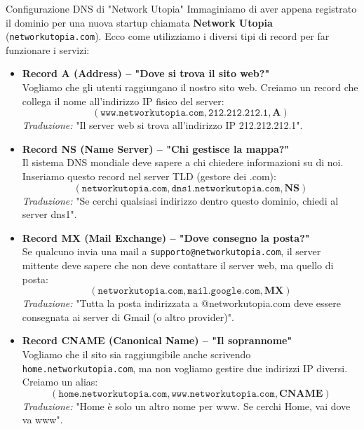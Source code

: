 \documentclass[a4paper,12pt]{report}
\begin{document}
\begin{esempiobox}{ Configurazione DNS di "Network Utopia"}
    Immaginiamo di aver appena registrato il dominio per una nuova startup chiamata \textbf{Network Utopia} (\texttt{networkutopia.com}). Ecco come utilizziamo i diversi tipi di record per far funzionare i servizi:

    \begin{itemize}
        \item \textbf{Record A (Address) -- "Dove si trova il sito web?"} \\
        Vogliamo che gli utenti raggiungano il nostro sito web. Creiamo un record che collega il nome all'indirizzo IP fisico del server:
        \[ (\texttt{www.networkutopia.com}, \texttt{212.212.212.1}, \textbf{A}) \]
        \textit{Traduzione:} "Il server web si trova all'indirizzo IP 212.212.212.1".

        \item \textbf{Record NS (Name Server) -- "Chi gestisce la mappa?"} \\
        Il sistema DNS mondiale deve sapere a chi chiedere informazioni su di noi. Inseriamo questo record nel server TLD (gestore dei .com):
        \[ (\texttt{networkutopia.com}, \texttt{dns1.networkutopia.com}, \textbf{NS}) \]
        \textit{Traduzione:} "Se cerchi qualsiasi indirizzo dentro questo dominio, chiedi al server dns1".

        \item \textbf{Record MX (Mail Exchange) -- "Dove consegno la posta?"} \\
        Se qualcuno invia una mail a \texttt{supporto@networkutopia.com}, il server mittente deve sapere che non deve contattare il server web, ma quello di posta:
        \[ (\texttt{networkutopia.com}, \texttt{mail.google.com}, \textbf{MX}) \]
        \textit{Traduzione:} "Tutta la posta indirizzata a @networkutopia.com deve essere consegnata ai server di Gmail (o altro provider)".

        \item \textbf{Record CNAME (Canonical Name) -- "Il soprannome"} \\
        Vogliamo che il sito sia raggiungibile anche scrivendo \texttt{home.networkutopia.com}, ma non vogliamo gestire due indirizzi IP diversi. Creiamo un alias:
        \[ (\texttt{home.networkutopia.com}, \texttt{www.networkutopia.com}, \textbf{CNAME}) \]
        \textit{Traduzione:} "Home è solo un altro nome per www. Se cerchi Home, vai dove va www".
    \end{itemize}
\end{esempiobox}
\end{document}
